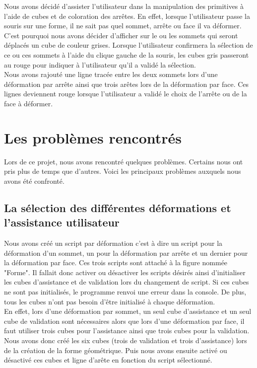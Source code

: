 \documentclass[a4paper,oneside,12pt,titlepage]{article}
\begin{document}
Nous avons décidé d'assister l'utilisateur dans la manipulation des primitives à l'aide de cubes et de coloration des arrêtes. En effet, lorsque l'utilisateur passe la souris sur une forme, il ne sait pas quel sommet, arrête ou face il va déformer.\\ C'est pourquoi nous avons décider d'afficher sur le ou les sommets qui seront déplacés un cube de couleur grises. Lorsque l'utilisateur confirmera la sélection de ce ou ces sommets à l'aide du clique gauche de la souris, les cubes gris passeront au rouge pour indiquer à l'utilisateur qu'il a validé la sélection.\\
Nous avons rajouté une ligne tracée entre les deux sommets lors d'une déformation par arrête ainsi que trois arêtes lors de la déformation par face. Ces lignes deviennent rouge lorsque l'utilisateur a validé le choix de l'arrête ou de la face à déformer.



\section{Les problèmes rencontrés}

Lors de ce projet, nous avons rencontré quelques problèmes. Certains nous ont pris plus de temps que d'autres. Voici les principaux problèmes auxquels nous avons été confronté.

\subsection{La sélection des différentes déformations et l'assistance utilisateur}
Nous avons créé un script par déformation c'est à dire un script pour la déformation d'un sommet, un pour la déformation par arrête et un dernier pour la déformation par face. Ces trois scripts sont attaché à la figure nommée "Forme". Il fallait donc activer ou désactiver les scripts désirés ainsi d'initialiser les cubes d'assistance et de validation lors du changement de script. Si ces cubes ne sont pas initialisés, le programme renvoi une erreur dans la console. De plus, tous les cubes n'ont pas besoin d'être initialisé à chaque déformation.
\\ En effet, lors d'une déformation par sommet, un seul cube d'assistance et un seul cube de validation sont nécessaires alors que lors d'une déformation par face, il  faut utiliser  trois cubes pour l'assistance ainsi que trois cubes pour la validation. Nous avons donc créé les six cubes (trois de validation et trois d'assistance) lors de la création de la forme géométrique. Puis nous avons ensuite activé ou désactivé ces cubes et ligne d'arête en fonction du script sélectionné.
\end{document}
